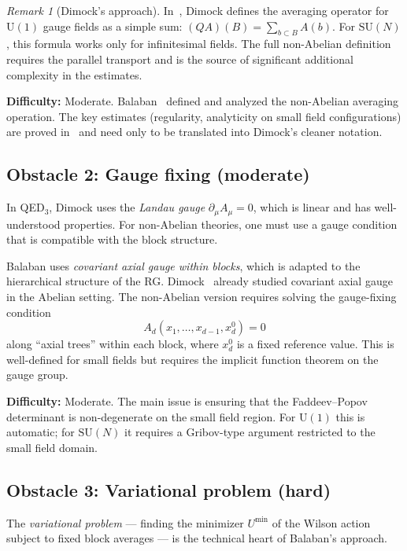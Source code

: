 \documentclass[11pt,a4paper]{article}
\theoremstyle{plain}
\theoremstyle{definition}
\theoremstyle{remark}
\newtheorem{remark}[theorem]{Remark}
\newcommand{\SU}{\mathrm{SU}}
\newcommand{\U}{\mathrm{U}}
\begin{document}
\begin{remark}[Dimock's approach]
  In~\cite{Dimock22}, Dimock defines the averaging operator
  for $\U(1)$ gauge fields as a simple sum:
  $(QA)(B) = \sum_{b \subset B} A(b)$.
  For $\SU(N)$, this formula works only for
  infinitesimal fields. The full non-Abelian definition
  requires the parallel transport and is the source of
  significant additional complexity in the estimates.
\end{remark}

\textbf{Difficulty:} Moderate. Balaban~\cite{Bal85a}
defined and analyzed the non-Abelian averaging operation.
The key estimates (regularity, analyticity on small field
configurations) are proved in~\cite{Bal85a} and need
only to be translated into Dimock's cleaner notation.

\subsection{Obstacle 2: Gauge fixing (moderate)}

In QED$_3$, Dimock uses the \emph{Landau gauge}
$\partial_\mu A_\mu = 0$, which is linear and
has well-understood properties. For non-Abelian
theories, one must use a gauge condition that is
compatible with the block structure.

Balaban uses \emph{covariant axial gauge within blocks},
which is adapted to the hierarchical structure of the RG.
Dimock~\cite{Dimock15a} already studied covariant axial
gauge in the Abelian setting. The non-Abelian version
requires solving the gauge-fixing condition
\begin{equation}\label{eq:axial_gauge}
  A_d(x_1, \ldots, x_{d-1}, x_d^0) = 0
\end{equation}
along ``axial trees'' within each block, where $x_d^0$
is a fixed reference value. This is well-defined for
small fields but requires the implicit function theorem
on the gauge group.

\textbf{Difficulty:} Moderate. The main issue is
ensuring that the Faddeev--Popov determinant is
non-degenerate on the small field region.
For $\U(1)$ this is automatic; for $\SU(N)$ it
requires a Gribov-type argument restricted to the
small field domain.

\subsection{Obstacle 3: Variational problem (hard)}

The \emph{variational problem} --- finding the
minimizer $U^{\min}$ of the Wilson action
subject to fixed block averages --- is the technical
heart of Balaban's approach.
\end{document}

